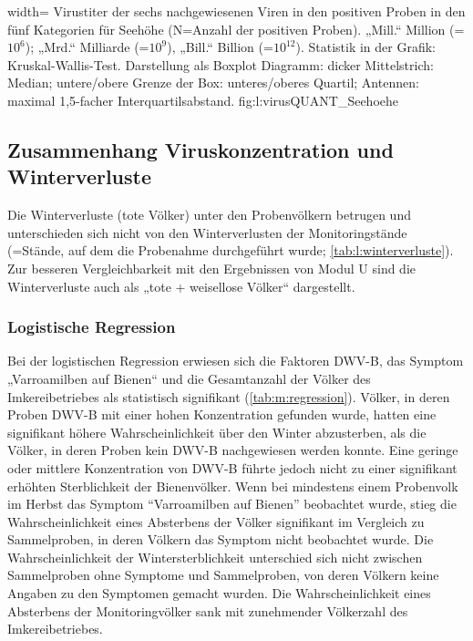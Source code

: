   
  {width=\textwidth} %
  {Virustiter der sechs nachgewiesenen Viren in den positiven Proben in den fünf Kategorien für Seehöhe (N=Anzahl der positiven Proben). „Mill.“ Million (=$10^6$); „Mrd.“ Milliarde (=$10^9$), „Bill.“ Billion (=$10^{12}$). Statistik in der Grafik: Kruskal-Wallis-Test. Darstellung als Boxplot Diagramm: dicker Mittelstrich: Median; untere/obere Grenze der Box: unteres/oberes Quartil; Antennen: maximal 1,5-facher Interquartilsabstand.} %
  {} %
  {fig:l:virusQUANT_Seehoehe} %
  
  
  
 \subsection{Zusammenhang Viruskonzentration und Winterverluste}
  
Die Winterverluste (tote Völker) unter den Probenvölkern betrugen  und unterschieden sich nicht von den Winterverlusten der Monitoringstände (=Stände, auf dem die Probenahme durchgeführt wurde; \cref{tab:l:winterverluste}). Zur besseren Vergleichbarkeit mit den Ergebnissen von Modul U sind die Winterverluste auch als „tote + weisellose Völker“ dargestellt.
  

  
\subsubsection{Logistische Regression}

Bei der logistischen Regression erwiesen sich die Faktoren DWV-B, das Symptom „Varroamilben auf Bienen“ und die Gesamtanzahl der Völker des Imkereibetriebes als statistisch signifikant (\cref{tab:m:regression}). Völker, in deren Proben DWV-B mit einer hohen Konzentration gefunden wurde, hatten eine signifikant höhere Wahrscheinlichkeit über den Winter abzusterben, als die Völker, in deren Proben kein DWV-B nachgewiesen werden konnte. Eine geringe oder mittlere Konzentration von DWV-B führte jedoch nicht zu einer signifikant erhöhten Sterblichkeit der Bienenvölker. Wenn bei mindestens einem Probenvolk im Herbst das Symptom \enquote{Varroamilben auf Bienen} beobachtet wurde, stieg die Wahrscheinlichkeit eines Absterbens der Völker signifikant im Vergleich zu Sammelproben, in deren Völkern das Symptom nicht beobachtet wurde. Die Wahrscheinlichkeit der Wintersterblichkeit unterschied sich nicht zwischen Sammelproben ohne Symptome und Sammelproben, von deren Völkern keine Angaben zu den Symptomen gemacht wurden. Die Wahrscheinlichkeit eines Absterbens der Monitoringvölker sank mit zunehmender Völkerzahl des Imkereibetriebes. 


